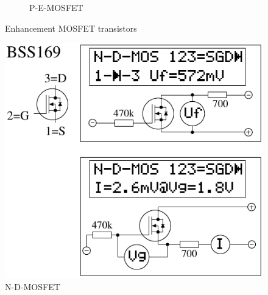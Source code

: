 \begin{figure}[H]
\begin{subfigure}[b]{9cm}
    \caption{P-E-MOSFET}
    \label{fig:MOS-P-E}
  \end{subfigure}
  \caption{Enhancement MOSFET transistors}
\end{figure}



\begin{figure}[H]
\centering
\includegraphics[]{../FIG/MOS_BSS169.pdf}
\caption{N-D-MOSFET}
\label{fig:MOS-N-D}
\end{figure}

